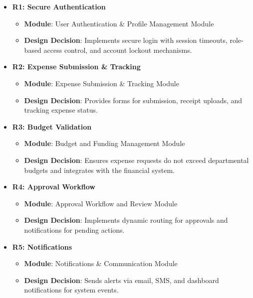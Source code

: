 \documentclass[12pt, titlepage]{article}
\begin{document}
\begin{itemize}
    \item \textbf{R1: Secure Authentication}
    \begin{itemize}
        \item \textbf{Module}: User Authentication \& Profile Management Module
        \item \textbf{Design Decision}: Implements secure login with session timeouts, role-based access control, and account lockout mechanisms.
    \end{itemize}
    
    \item \textbf{R2: Expense Submission \& Tracking}
    \begin{itemize}
        \item \textbf{Module}: Expense Submission \& Tracking Module
        \item \textbf{Design Decision}: Provides forms for submission, receipt uploads, and tracking expense status.
    \end{itemize}
    
    \item \textbf{R3: Budget Validation}
    \begin{itemize}
        \item \textbf{Module}: Budget and Funding Management Module
        \item \textbf{Design Decision}: Ensures expense requests do not exceed departmental budgets and integrates with the financial system.
    \end{itemize}
    
    \item \textbf{R4: Approval Workflow}
    \begin{itemize}
        \item \textbf{Module}: Approval Workflow and Review Module
        \item \textbf{Design Decision}: Implements dynamic routing for approvals and notifications for pending actions.
    \end{itemize}
    
    \item \textbf{R5: Notifications}
    \begin{itemize}
        \item \textbf{Module}: Notifications \& Communication Module
        \item \textbf{Design Decision}: Sends alerts via email, SMS, and dashboard notifications for system events.
    \end{itemize}
    

\end{itemize}
\end{document}
